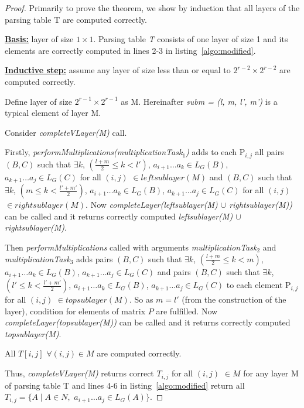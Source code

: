 \begin{proof}
Primarily to prove the theorem, we show by induction that all layers of the parsing table T are computed correctly.

\underline{\textbf{Basis:}} layer of size $1 \times 1$.
Parsing table \textit{T} consists of one layer of size 1 and its elements are correctly computed in lines 2-3 in listing~\ref{algo:modified}.

\underline{\textbf{Inductive step:}} assume any layer of size less than or equal to $2^{r - 2} \times 2^{r - 2}$ are computed correctly. 

Define layer of size $2^{r - 1} \times 2^{r - 1}$ as M. 
Hereinafter \textit{subm = (l, m, l', m')} is a typical element of layer M.

Consider \textit{completeVLayer(M)} call. 

Firstly, \textit{performMultiplications(multiplicationTask$_1$)} adds to each P$_{i,j}$ all pairs 
$(B, C)$ such that $\exists k$, $(\frac{l+m}{2} \le k < l')$, $a_{i + 1} \dots a_{k} \in L_{G}(B)$, $a_{k + 1} \dots a_{j} \in L_{G}(C)$ for all $(i, j)$ $\in leftsublayer(M)$
and
$(B, C)$ such that $\exists k$, $(m \le k < \frac{l'+m'}{2})$, $a_{i + 1} \dots a_{k} \in L_{G}(B)$, $a_{k + 1} \dots a_{j} \in L_{G}(C)$ for all $(i, j)$ $\in rightsublayer(M)$.
Now \textit{completeLayer(leftsublayer(M) $\cup$ rightsublayer(M))} can be called and it returns correctly computed \textit{leftsublayer(M) $\cup$ rightsublayer(M)}.

Then \textit{performMultiplications} called with arguments 
\textit{multiplicationTask$_2$} and \textit{multiplicationTask$_3$} adds pairs 
$(B, C)$ such that $\exists k$, $(\frac{l+m}{2} \le k < m)$, $a_{i + 1} \dots a_{k} \in L_{G}(B)$, $a_{k + 1} \dots a_{j} \in L_{G}(C)$ 
and pairs
$(B, C)$ such that $\exists k$, $(l' \le k < \frac{l'+m'}{2})$, $a_{i + 1} \dots a_{k} \in L_{G}(B)$, $a_{k + 1} \dots a_{j} \in L_{G}(C)$
to each element P$_{i,j}$ for all $(i, j)$ $\in topsublayer(M)$. 
So as $m = l'$ (from the construction of the layer), condition for elements of matrix $P$ are fulfilled.
Now \textit{completeLayer(topsublayer(M))} can be called and it returns correctly computed \textit{topsublayer(M)}.

All $T[i, j]$ $\forall (i, j) \in M$ are computed correctly.

Thus, \textit{completeVLayer(M)} returns correct $T_{i, j}$ for all $(i, j)$ $\in M$ for any layer M of parsing table T and lines 4-6 in listing~\ref{algo:modified} return all $T_{i, j} =  \{ A \mid A \in N, $ $a_{i + 1} \dots a_{j} \in L_{G}(A)\}$.
\end{proof}


